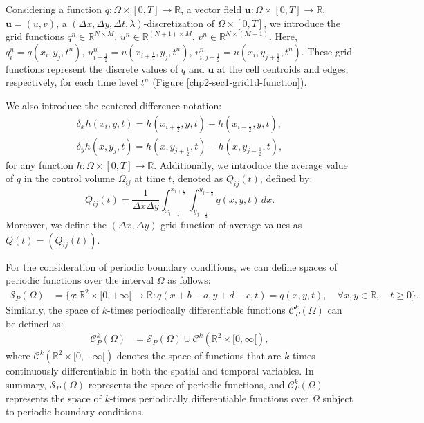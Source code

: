 Considering a function $q:\Omega\times[0,T] \to \mathbb{R}$,
a vector field $\boldsymbol{u}:\Omega\times[0,T] \to \mathbb{R}$, $\boldsymbol{u}=(u,v)$,
a $(\Delta x,\Delta y, \Delta t, \lambda)$-discretization
of $\Omega\times[0,T]$, we introduce the grid functions $q^n \in \mathbb{R}^{N\times M}$,
$u^n \in \mathbb{R}^{(N+1)\times M}$, $v^n \in \mathbb{R}^{N\times (M+1)}$. 
Here, ${q}^n_{i} = {q}(x_i, y_j,t^{n})$, $u^n_{i+\frac{1}{2}} = u(x_{i+\frac{1}{2}},y_j, t^n)$,
$v^n_{i,j+\frac{1}{2}} = u(x_i,y_{j+\frac{1}{2}}, t^n)$.
These grid functions represent the discrete values of $q$ and $\boldsymbol{u}$
at the cell centroids and edges, respectively,
for each time level $t^n$ (Figure \ref{chp2-sec1-grid1d-function}).

We also introduce the centered difference notation:
\begin{align}
	\label{sec-adv2d:eq6}
	\delta_x {h}(x_i,y, t) = 
	{h}(x_{i+\frac{1}{2}}, y, t) - 
	{h}(x_{i-\frac{1}{2}}, y, t), \\
	\delta_y {h}(x, y_j,t) = 
    {h}(x, y_{j+\frac{1}{2}},t) - 
    {h}(x, y_{j-\frac{1}{2}},t),
\end{align}
for any function $h: \Omega \times [0,T] \to \mathbb{R}$.
Additionally, we introduce the average value of $q$ in the control volume
$\Omega_{ij}$ at time $t$, denoted as ${Q}_{ij}(t)$, defined by:
\begin{equation}
	\label{chp3-sec1-not2}
	{Q}_{ij}(t) = \frac{1}{\Delta x \Delta y}
	\int_{x_{i-\frac{1}{2}}}^{x_{i+\frac{1}{2}}} \int_{y_{j-\frac{1}{2}}}^{y_{j-\frac{1}{2}}} {q}(x,y,t) \,dx.
\end{equation}
Moreover, we define the $(\Delta x, \Delta y)$-grid function of average values as $Q(t) = (Q_{ij}(t))$.

For the consideration of periodic boundary conditions, we can define spaces of periodic functions over 
the interval $\Omega$ as follows:
\begin{align*}
	\mathcal{S}_P(\Omega) &= \{q:\mathbb{R}^2\times[0,+\infty[\to \mathbb{R}: q(x+b-a,y+d-c,t)=q(x,y,t), \quad \forall x,y \in \mathbb{R}, \quad t\geq0\}.
\end{align*}
Similarly, the space of $k$-times periodically differentiable functions $\mathcal{C}_P^k(\Omega)$ can be defined as:
\begin{align*}
	\mathcal{C}_P^k(\Omega) &= \mathcal{S}_P(\Omega)\cup \mathcal{C}^k(\mathbb{R}^2\times[0,\infty[),
\end{align*}
where $\mathcal{C}^k(\mathbb{R}^2\times[0,+\infty[)$ denotes the space of functions that are $k$ 
times continuously differentiable in both the spatial and temporal variables.
In summary, $\mathcal{S}_P(\Omega)$ represents the space of periodic functions, and $\mathcal{C}_P^k(\Omega)$
represents the space of $k$-times periodically differentiable functions over $\Omega$ subject to periodic boundary conditions.

